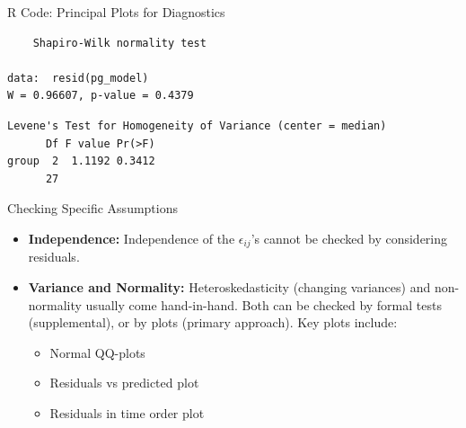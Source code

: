 \begin{frame}{R Code: Principal Plots for Diagnostics}
\begin{knitrout}
\begin{kframe}
\begin{verbatim}
	Shapiro-Wilk normality test

data:  resid(pg_model)
W = 0.96607, p-value = 0.4379
\end{verbatim}
\begin{alltt}
 \hlopt{~}   
\end{alltt}
\begin{verbatim}
Levene's Test for Homogeneity of Variance (center = median)
      Df F value Pr(>F)
group  2  1.1192 0.3412
      27               
\end{verbatim}
\end{kframe}
\end{knitrout}

\end{frame}

\begin{frame}{Checking Specific Assumptions}
  \begin{itemize}
    \item \textbf{Independence:} Independence of the $\epsilon_{ij}$'s cannot be checked by considering residuals.
        
        
        \framebreak
        
    \item \textbf{Variance and Normality:} Heteroskedasticity (changing variances) and non-normality usually come hand-in-hand. Both can be checked by formal tests (supplemental), or by plots (primary approach). Key plots include:
    \begin{itemize}
      \item Normal QQ-plots
      \item Residuals vs predicted plot
      \item Residuals in time order plot
    \end{itemize}
    
  \end{itemize}

\end{frame}

